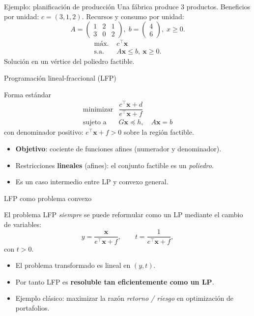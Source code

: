 \documentclass[10pt,aspectratio=169]{beamer}
\newcommand{\x}{\mathbf{x}}
\newcommand{\0}{\mathbf{0}}
\begin{document}
\begin{frame}{Ejemplo: planificación de producción}
  Una fábrica produce 3 productos. Beneficios por unidad: $c=(3,1,2)$.
  Recursos y consumo por unidad:
  \[
    A=\begin{pmatrix}1&2&1\\3&0&2\end{pmatrix},\;
    b=\begin{pmatrix}4\\6\end{pmatrix},\;
    x\ge 0.
  \]
  \begin{align*}
    \text{máx. } & c^\top\x \\
    \text{s.a. }  & A\x\le b,\ \x\ge 0.
  \end{align*}
  Solución en un vértice del poliedro factible.
\end{frame}

\begin{frame}{Programación lineal-fraccional (LFP)}
  \begin{block}{Forma estándar}
    \[
      \begin{array}{ll}
        \text{minimizar} & \dfrac{c^\top\x + d}{e^\top\x + f} \\[0.6em]
        \text{sujeto a}  & G\x\preceq h,\quad A\x=b
      \end{array}
    \]
    con denominador positivo: $e^\top\x+f>0$ sobre la región factible.
  \end{block}
  \begin{itemize}
    \item \textbf{Objetivo}: cociente de funciones afines (numerador y
      denominador).
    \item Restricciones \textbf{lineales} (afines): el conjunto factible es
      un \emph{poliedro}.
    \item Es un caso intermedio entre LP y convexo general.
  \end{itemize}
\end{frame}

\begin{frame}{LFP como problema convexo}
  \begin{alertblock}{}
    El problema LFP \emph{siempre} se puede reformular como un LP
    mediante el cambio de variables:
    \[
      y=\frac{\x}{e^\top\x+f},\qquad
      t=\frac{1}{e^\top\x+f},
    \]
    con $t>0$.
  \end{alertblock}
  \begin{itemize}
    \item El problema transformado es lineal en $(y,t)$.
    \item Por tanto LFP es \textbf{resoluble tan eficientemente como un LP}.
    \item Ejemplo clásico: maximizar la razón \emph{retorno / riesgo}
      en optimización de portafolios.
  \end{itemize}
\end{frame}
\end{document}
